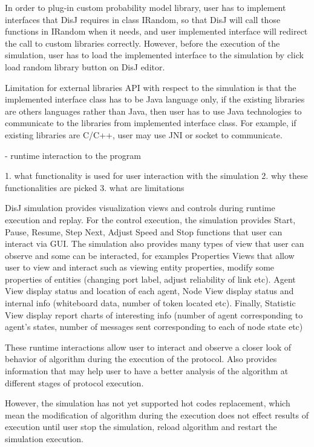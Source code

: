 In order to plug-in custom probability model library, user has to implement interfaces that DisJ requires in class IRandom, so that DisJ will call those functions in IRandom when it needs, and user implemented interface will redirect the call to custom libraries correctly. However, before the execution of the simulation, user has to load the implemented interface to the simulation by click load random library button on DisJ editor.

Limitation for external libraries API with respect to the simulation is that the implemented interface class has to be Java language only, if the existing libraries are others languages rather than Java, then user has to use Java technologies to communicate to the libraries from implemented interface class. For example, if existing libraries are C/C++, user may use JNI or socket to communicate.



- runtime interaction to the program

1. what functionality is used for user interaction with the simulation
2. why these functionalities are picked
3. what are limitations

DisJ simulation provides visualization views and controls during runtime execution and replay. For the control execution, the simulation provides Start, Pause, Resume, Step Next, Adjust Speed and Stop functions that user can interact via GUI. The simulation also provides many types of view that user can observe and some can be interacted, for examples Properties Views that allow user to view and interact such as viewing entity properties, modify some properties of entities (changing port label, adjust reliability of link etc). Agent View display status and location of each agent, Node View display status and internal info (whiteboard data, number of token located etc). Finally, Statistic View display report charts of interesting info (number of agent corresponding to agent's states, number of messages sent corresponding to each of node state etc)

These runtime interactions allow user to interact and observe a closer look of behavior of algorithm during the execution of the protocol. Also provides information that may help user to have a better analysis of the algorithm at different stages of protocol execution.

However, the simulation has not yet supported hot codes replacement, which mean the modification of algorithm during the execution does not effect results of execution until user stop the simulation, reload algorithm and restart the simulation execution.


